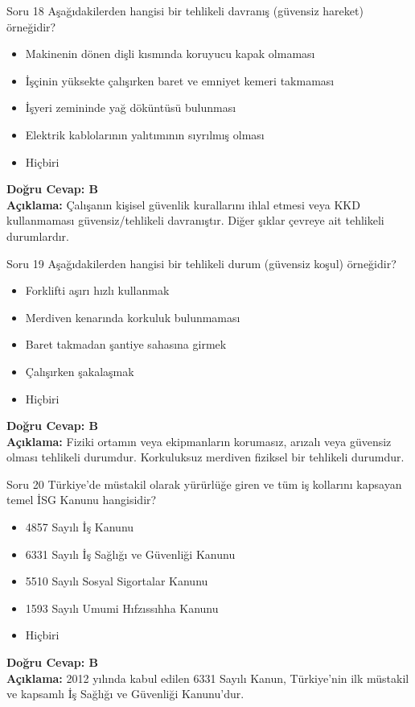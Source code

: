 \documentclass[12pt,a4paper]{article}
\begin{document}
\begin{testcard}{Soru 18}
    Aşağıdakilerden hangisi bir tehlikeli davranış (güvensiz hareket) örneğidir?
    \begin{itemize}
        \item[A)] Makinenin dönen dişli kısmında koruyucu kapak olmaması
        \item[B)] İşçinin yüksekte çalışırken baret ve emniyet kemeri takmaması
        \item[C)] İşyeri zemininde yağ döküntüsü bulunması
        \item[D)] Elektrik kablolarının yalıtımının sıyrılmış olması
        \item[E)] Hiçbiri
    \end{itemize}
    \tcblower
    \textbf{Doğru Cevap: B} \\
    \textbf{Açıklama:} Çalışanın kişisel güvenlik kurallarını ihlal etmesi veya KKD kullanmaması güvensiz/tehlikeli davranıştır. Diğer şıklar çevreye ait tehlikeli durumlardır.
\end{testcard}

\begin{testcard}{Soru 19}
    Aşağıdakilerden hangisi bir tehlikeli durum (güvensiz koşul) örneğidir?
    \begin{itemize}
        \item[A)] Forklifti aşırı hızlı kullanmak
        \item[B)] Merdiven kenarında korkuluk bulunmaması
        \item[C)] Baret takmadan şantiye sahasına girmek
        \item[D)] Çalışırken şakalaşmak
        \item[E)] Hiçbiri
    \end{itemize}
    \tcblower
    \textbf{Doğru Cevap: B} \\
    \textbf{Açıklama:} Fiziki ortamın veya ekipmanların korumasız, arızalı veya güvensiz olması tehlikeli durumdur. Korkuluksuz merdiven fiziksel bir tehlikeli durumdur.
\end{testcard}

\begin{testcard}{Soru 20}
    Türkiye'de müstakil olarak yürürlüğe giren ve tüm iş kollarını kapsayan temel İSG Kanunu hangisidir?
    \begin{itemize}
        \item[A)] 4857 Sayılı İş Kanunu
        \item[B)] 6331 Sayılı İş Sağlığı ve Güvenliği Kanunu
        \item[C)] 5510 Sayılı Sosyal Sigortalar Kanunu
        \item[D)] 1593 Sayılı Umumi Hıfzıssıhha Kanunu
        \item[E)] Hiçbiri
    \end{itemize}
    \tcblower
    \textbf{Doğru Cevap: B} \\
    \textbf{Açıklama:} 2012 yılında kabul edilen 6331 Sayılı Kanun, Türkiye'nin ilk müstakil ve kapsamlı İş Sağlığı ve Güvenliği Kanunu'dur.
\end{testcard}
\end{document}
